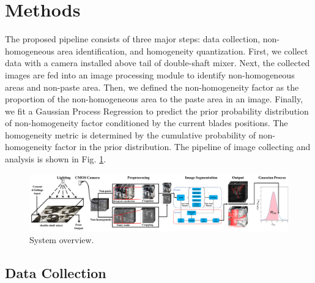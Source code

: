 \documentclass[pdflatex,sn-mathphys]{sn-jnl}%
\theoremstyle{thmstyleone}%
\theoremstyle{thmstyletwo}%
\theoremstyle{thmstylethree}%
\begin{document}
\section{Methods}\label{sec2}


The proposed pipeline consists of three major steps: data collection, non-homogeneous area identification, and homogeneity quantization. 
First, we collect data with a camera installed above tail of double-shaft mixer. Next, the collected images are fed into an image processing module to identify non-homogeneous areas and non-paste area. 
Then, we defined the non-homogeneity factor as the proportion of the non-homogeneous area to the paste area in an image. 
Finally, we fit a Gaussian Process Regression to predict the prior probability distribution of non-homogeneity factor conditioned by the current blades positions.
The homogeneity metric is determined by the cumulative probability of non-homogeneity factor in the prior distribution.
The pipeline of image collecting and analysis is shown in Fig. \ref{fig:pipeline}. 
\begin{figure}[htb]
    \centering
    \includegraphics[width=0.99\linewidth]{images/pipeline.png}
    \caption{System overview.}
    \label{fig:pipeline}
\end{figure}

\subsection{Data Collection}
\end{document}
